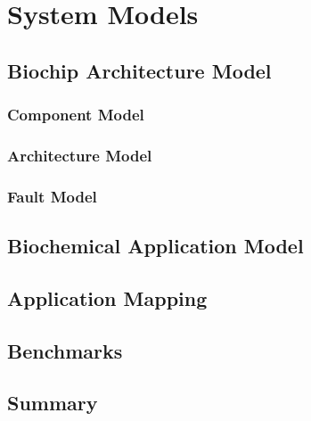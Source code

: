 \chapter{System Models}

\section{Biochip Architecture Model}

\subsection{Component Model}

\subsection{Architecture Model}

\subsection{Fault Model}

\section{Biochemical Application Model}

\section{Application Mapping}

\section{Benchmarks}

\section{Summary}